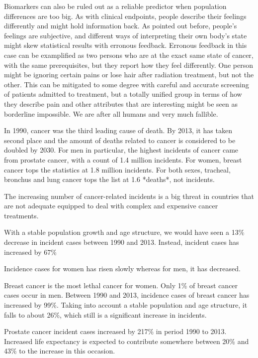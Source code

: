Biomarkers can also be ruled out as a reliable predictor when population
differences are too big. As with clinical endpoints, people describe their
feelings differently and might hold information back. As pointed out before,
people's feelings are subjective, and different ways of interpreting their own
body's state might skew statistical results with erronous feedback. Erronous
feedback in this case can be examplified as two persons who are at the exact
same state of cancer, with the same prerequisites, but they report how they feel
differently. One person might be ignoring certain pains or lose hair after
radiation treatment, but not the other. This can be mitigated to some degree
with careful and accurate screening of patients admitted to treatment, but a
totally unified group in terms of how they describe pain and other attributes
that are interesting might be seen as borderline impossible. We are after all
humans and very much fallible.

In 1990, cancer was the third leading cause of death. By 2013, it has taken
second place and the amount of deaths related to cancer is considered to be
doubled by 2030. For men in particular, the highest incidents of cancer came
from prostate cancer, with a count of 1.4 million incidents. For women, breast
cancer tops the statistics at 1.8 million incidents. For both sexes, tracheal,
bronchus and lung cancer tops the list at 1.6 *deaths*, not incidents.

The increasing number of cancer-related incidents is a big threat in countries
that are not adequate equipped to deal with complex and expensive cancer
treatments.

With a stable population growth and age structure, we would have seen a 13\%
decrease in incident cases between 1990 and 2013. Instead, incident cases has
increased by 67\%

Incidence cases for women has risen slowly whereas for men, it has decreased.

Breast cancer is the most lethal cancer for women. Only 1\% of breast cancer
cases occur in men. Between 1990 and 2013, incidence cases of breast cancer has
increased by 99\%. Taking into account a stable population and age structure, it
falls to about 26\%, which still is a significant increase in incidents.

Prostate cancer incident cases increased by 217\% in period 1990 to 2013.
Increased life expectancy is expected to contribute somewhere between 20\% and
43\% to the increase in this occasion.

